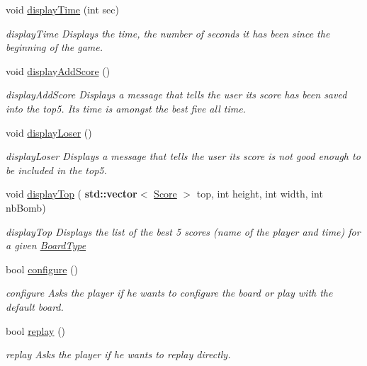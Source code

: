 \begin{DoxyCompactItemize}
void \hyperlink{class_view_a52ce6dec383d190722866c0c95175cbc}{display\+Time} (int sec)
\begin{DoxyCompactList}\small\item\em display\+Time Displays the time, the number of seconds it has been since the beginning of the game. \end{DoxyCompactList}\item 
\mbox{\label{class_view_a2ebe106edbe9a2e542a3fadfacf83e0e}} 
void \hyperlink{class_view_a2ebe106edbe9a2e542a3fadfacf83e0e}{display\+Add\+Score} ()
\begin{DoxyCompactList}\small\item\em display\+Add\+Score Displays a message that tells the user its score has been saved into the top5. Its time is amongst the best five all time. \end{DoxyCompactList}\item 
\mbox{\label{class_view_a6285efb26a0b69d91f10b6619707c987}} 
void \hyperlink{class_view_a6285efb26a0b69d91f10b6619707c987}{display\+Loser} ()
\begin{DoxyCompactList}\small\item\em display\+Loser Displays a message that tells the user its score is not good enough to be included in the top5. \end{DoxyCompactList}\item 
void \hyperlink{class_view_a0dac30dd1c0efc45d2918ee9ed43f155}{display\+Top} (\textbf{ std\+::vector}$<$ \hyperlink{class_score}{Score} $>$ top, int height, int width, int nb\+Bomb)
\begin{DoxyCompactList}\small\item\em display\+Top Displays the list of the best 5 scores (name of the player and time) for a given \hyperlink{struct_board_type}{Board\+Type} \end{DoxyCompactList}\item 
bool \hyperlink{class_view_a8c735d0d8eba27cee9e4ea10d2161905}{configure} ()
\begin{DoxyCompactList}\small\item\em configure Asks the player if he wants to configure the board or play with the default board. \end{DoxyCompactList}\item 
bool \hyperlink{class_view_afb916cc64d0666923a67065771907fe3}{replay} ()
\begin{DoxyCompactList}\small\item\em replay Asks the player if he wants to replay directly. \end{DoxyCompactList}\item 

\end{DoxyCompactItemize}
